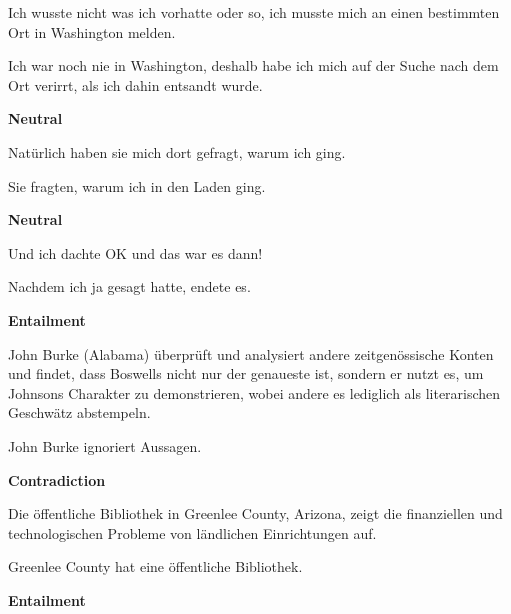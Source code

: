 \begin{examples}
  \label{ex:xnli}
  \item Ich wusste nicht was ich vorhatte oder so, ich musste mich an einen bestimmten Ort in Washington melden.

        Ich war noch nie in Washington, deshalb habe ich mich auf der Suche nach dem Ort verirrt, als ich dahin entsandt wurde.

  \textbf{Neutral}
\end{examples}

\begin{examples}
  \item Natürlich haben sie mich dort gefragt, warum ich ging.

        Sie fragten, warum ich in den Laden ging.

  \textbf{Neutral}
\end{examples}

\begin{examples}
  \item Und ich dachte OK und das war es dann!

        Nachdem ich ja gesagt hatte, endete es.

  \textbf{Entailment}
\end{examples}

\begin{examples}
\item John Burke (Alabama) überprüft und analysiert andere zeitgenössische Konten und findet, dass Boswells nicht nur der genaueste ist, sondern er nutzt es, um Johnsons Charakter zu demonstrieren, wobei andere es lediglich als literarischen Geschwätz abstempeln.

        John Burke ignoriert Aussagen.

  \textbf{Contradiction}
\end{examples}

\begin{examples}
  \item Die öffentliche Bibliothek in Greenlee County, Arizona, zeigt die finanziellen und technologischen Probleme von ländlichen Einrichtungen auf.

        Greenlee County hat eine öffentliche Bibliothek.

  \textbf{Entailment}
\end{examples}



